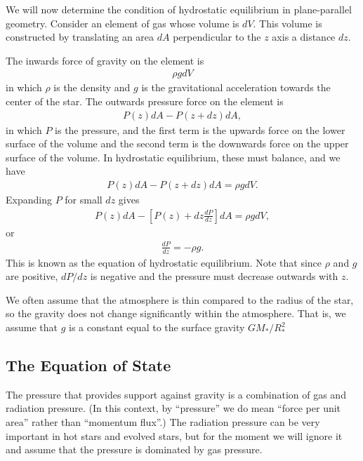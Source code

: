 We will now determine the condition of hydrostatic equilibrium in plane-parallel geometry. Consider an element of gas whose volume is $dV$. This volume is constructed by translating an area $dA$ perpendicular to the $z$ axis a distance $dz$.

The inwards force of gravity on the element is 
\begin{align}
\rho g dV
\end{align}
in which $\rho$ is the density and $g$ is the gravitational acceleration towards the center of the star.
The outwards pressure force on the element is
\begin{align}
P(z)dA - P(z+dz)dA,
\end{align}
in which $P$ is the pressure, and the first term is the upwards force on the lower surface of the volume and the second term is the downwards force on the upper surface of the volume. In hydrostatic equilibrium, these must balance, and we have
\begin{align}
P(z)dA - P(z+dz)dA = \rho g dV.
\end{align}
Expanding $P$ for small $dz$ gives
\begin{align}
P(z)dA - \left[P(z) + dz \frac{dP}{dz}\right] dA = \rho g dV,
\end{align}
or
\begin{align}
\frac{dP}{dz} = -\rho g.
\label{equation:hydrostatic-equilibrium}
\end{align}
This is known as the equation of hydrostatic equilibrium. Note that since $\rho$ and $g$ are positive, $dP/dz$ is negative and the pressure must decrease outwards with $z$.

We often assume that the atmosphere is thin compared to the radius of the star, so the gravity does not change significantly within the atmosphere. That is, we assume that $g$ is a constant equal to the surface gravity $GM_*/R_*^2$

\newslide

\subsection{The Equation of State}

The pressure that provides support against gravity is a combination of gas and radiation pressure. (In this context, by “pressure” we do mean “force per unit area” rather than “momentum flux”.) The radiation pressure can be very important in hot stars and evolved stars, but for the moment we will ignore it and assume that the pressure is dominated by gas pressure.

